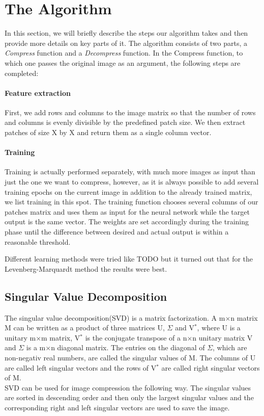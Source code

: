 \section{The Algorithm}
\label{sec:algorithm}

In this section, we will briefly describe the steps our algorithm takes and then provide more details on key parts of it. The algorithm consists of two parts, a \emph{Compress} function and a \emph{Decompress} function. In the Compress function, to which one passes the original image as an argument, the following steps are completed:
\paragraph{Feature extraction} First, we add rows and columns to the image matrix so that the number of rows and columns is evenly divisible by the predefined patch size. We then extract patches of size {\color{red}X by X} and return them as a single column vector.

\paragraph{Training} Training is actually performed separately, with much more images as input than just the one we want to compress, however, as it is always possible to add several training epochs on the current image in addition to the already trained matrix, we list training in this spot. The training function chooses several columns of our patches matrix and uses them as input for the neural network while the target output is the same vector. The weights are set accordingly during the training phase until the difference between desired and actual output is within a reasonable threshold.



Different learning methods were tried like {\color{red}TODO} but it turned out that for the Levenberg-Marquardt method the results were best. 


\subsection{Singular Value Decomposition}
The singular value decomposition(SVD) is a matrix factorization. A m$\times$n matrix M can be written as a product of three matrices U, $\Sigma$ and V$^*$, where U is a unitary m$\times$m matrix, V$^*$ is the conjugate transpose of a n$\times$n unitary matrix V and $\Sigma$ is a m$\times$n diagonal matrix. The entries on the diagonal of $\Sigma$, which are non-negativ real numbers, are called the singular values of M. The columns of U are called left singular vectors and the rows of V$^*$ are called right singular vectors of M. \\
SVD can be used for image compression the following way. The singular values are sorted in descending order and then only the largest singular values and the corresponding right and left singular vectors are used to save the image.

